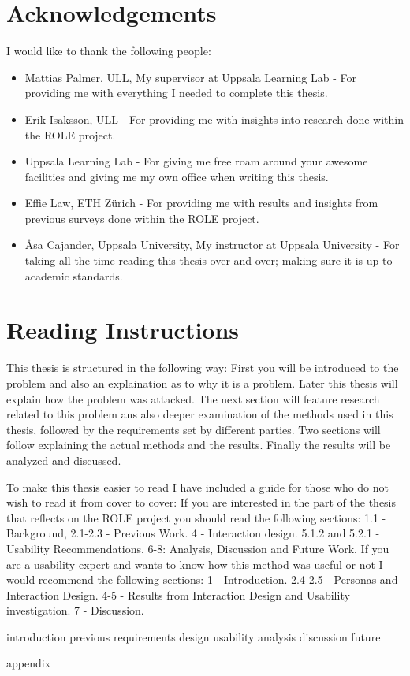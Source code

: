 \documentclass{article}
\begin{document}
	
	
	\newpage
	\thispagestyle{empty}
	\mbox{}
  
  \newpage
  \thispagestyle{empty}
	\mbox{}
  \newpage
  \thispagestyle{empty}
	\mbox{}
	\section*{Acknowledgements}
		I would like to thank the following people:
		\begin {itemize}
			\item Mattias Palmer, ULL, My  supervisor at Uppsala Learning Lab - For providing me with everything I needed to complete this thesis.
			\item Erik Isaksson, ULL - For providing me with insights into research done within the ROLE project.
			\item Uppsala Learning Lab - For giving me free roam around your awesome facilities and giving me my own office wh‌en writing this thesis.
			\item Effie Law, ETH Zürich - For providing me with results and insights from previous surveys done within the ROLE project.
			\item Åsa Cajander, Uppsala University, My instructor at Uppsala University - For taking all the time reading this thesis over and over; making sure it is up to academic standards.
		\end {itemize}
	\newpage
	\section*{Reading Instructions}
		This thesis is structured in the following way: First you will be introduced to the problem and also an explaination as to why it is a problem. Later this thesis will explain how the problem was attacked. The next section will feature research related to this problem ans also deeper examination of the methods used in this thesis, followed by the requirements set by different parties. Two sections will follow explaining the actual methods and the results. Finally the results will be analyzed and discussed.
		
		To make this thesis easier to read I have included a guide for those who do not wish to read it from cover to cover:
		If you are interested in the part of the thesis that reflects on the ROLE project you should read the following sections: 1.1 - Background, 2.1-2.3 - Previous Work. 4 - Interaction design. 5.1.2 and 5.2.1 - Usability Recommendations. 6-8: Analysis, Discussion and Future Work.
		If you are a usability expert and wants to know how this method was useful or not I would recommend the following sections: 1 - Introduction. 2.4-2.5 - Personas and Interaction Design. 4-5 - Results from Interaction Design and Usability investigation. 7 - Discussion.
	\newpage
	\tableofcontents
	
	 {introduction}
	 {previous}
	 {requirements}
	 {design}
	 {usability}
	 {analysis}
	 {discussion}
	 {future}
	
	
	
	
	 {appendix}
\end{document}
